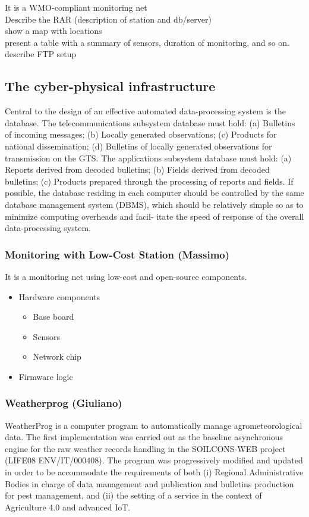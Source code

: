 \documentclass[authoryear,preprint,review,12pt]{elsarticle}
\begin{document}
It is a WMO-compliant monitoring net\\
Describe the RAR (description of station and db/server)\\
show a map with locations\\
present a table with a summary of sensors, duration of monitoring, and so on. \\
describe FTP setup

\subsection{The cyber-physical infrastructure}

Central to the design of an effective automated data-processing system is the database. The telecommunications subsystem database must hold:
(a) Bulletins of incoming messages;
(b) Locally generated observations;
(c) Products for national dissemination;
(d) Bulletins of locally generated observations for transmission on the GTS.
The applications subsystem database must hold:
(a) Reports derived from decoded bulletins;
(b) Fields derived from decoded bulletins;
(c) Products prepared through the processing of reports and fields.
If possible, the database residing in each computer should be controlled by the same database
management system (DBMS), which should be relatively simple so as to minimize computing overheads and facil- itate the speed of response of the overall data-processing system.


\subsubsection{Monitoring with Low-Cost Station (Massimo)}
It is a monitoring net using low-cost and open-source components.

\begin{itemize}
    \item Hardware components
    \begin{itemize}
        \item Base board
        \item Sensors
        \item Network chip
    \end{itemize}
    \item Firmware logic
\end{itemize}

\subsubsection{Weatherprog (Giuliano)}
WeatherProg \citep{Langella14_aiam} is a computer program to automatically manage agrometeorological data.
The first implementation was carried out as the baseline asynchronous engine for the raw weather records handling in the SOILCONS-WEB project (LIFE08 ENV/IT/000408).
The program was progressively modified and updated in order to be accommodate the requirements of both (i) Regional Administrative Bodies in charge of data management and publication and bulletins production for pest management, and (ii) the setting of a service in the context of Agriculture 4.0 and advanced IoT.
\end{document}
